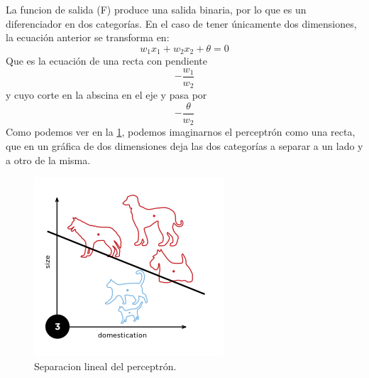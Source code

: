 La funcion de salida (F) produce una salida binaria, por lo que es un diferenciador en dos categorías. En el caso de tener únicamente dos dimensiones, la ecuación anterior se transforma en:
\begin{equation}
w_{1}x_{1} + w_{2}x_{2} + \theta = 0
\end{equation}
Que es la ecuación de una recta con pendiente \begin{equation}-\frac{w_{1}}{w_{2}}\end{equation} y cuyo corte en la abscina en el eje y pasa por \begin{equation}-\frac{\theta}{w_{2}}\end{equation}
Como podemos ver en la \ref{perceptron_recta}, podemos imaginarnos el perceptrón como una recta, que en un gráfica de dos dimensiones deja las dos categorías a separar a un lado y a otro de la misma.
\begin{figure}[htp]
\centering
\includegraphics[scale=0.5]{images/Perceptron_example.png}
\caption{Separacion lineal del perceptrón.}
\label{perceptron_recta}
\end{figure}
